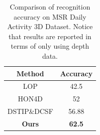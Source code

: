 \documentclass[final,3p,times,twocolumn]{elsarticle}
\begin{document}
\begin{table}[h]
 	\begin{center}
 		\begin{tabular}{c|c}
 		
 		{\bf Method} & {\bf Accuracy} \\
 		\hline
       LOP \cite{wang2012mining} &       42.5 \\
 		
     HON4D \cite{oreifej2013hon4d} &         52 \\
 		
 		DSTIP\&DCSF \cite{xia2013spatio} &      56.88 \\
 		\hline
 		{\bf Ours} & {\bf 62.5} \\
 		
 		\end{tabular}
 	\end{center}
 	\caption{\label{lbl:Table_Daily3D}Comparison of recognition accuracy on MSR Daily Activity 3D Dataset. Notice that results are reported in terms of only using depth data.}
\end{table}
 
\end{document}
